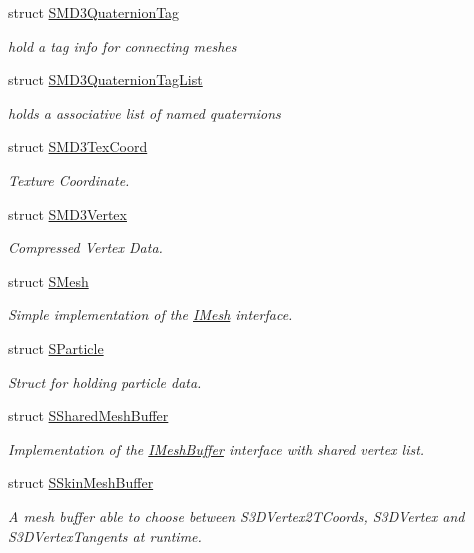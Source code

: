 \begin{DoxyCompactItemize}
struct \hyperlink{structirr_1_1scene_1_1SMD3QuaternionTag}{S\+M\+D3\+Quaternion\+Tag}
\begin{DoxyCompactList}\small\item\em hold a tag info for connecting meshes \end{DoxyCompactList}\item 
struct \hyperlink{structirr_1_1scene_1_1SMD3QuaternionTagList}{S\+M\+D3\+Quaternion\+Tag\+List}
\begin{DoxyCompactList}\small\item\em holds a associative list of named quaternions \end{DoxyCompactList}\item 
struct \hyperlink{structirr_1_1scene_1_1SMD3TexCoord}{S\+M\+D3\+Tex\+Coord}
\begin{DoxyCompactList}\small\item\em Texture Coordinate. \end{DoxyCompactList}\item 
struct \hyperlink{structirr_1_1scene_1_1SMD3Vertex}{S\+M\+D3\+Vertex}
\begin{DoxyCompactList}\small\item\em Compressed Vertex Data. \end{DoxyCompactList}\item 
struct \hyperlink{structirr_1_1scene_1_1SMesh}{S\+Mesh}
\begin{DoxyCompactList}\small\item\em Simple implementation of the \hyperlink{classirr_1_1scene_1_1IMesh}{I\+Mesh} interface. \end{DoxyCompactList}\item 
struct \hyperlink{structirr_1_1scene_1_1SParticle}{S\+Particle}
\begin{DoxyCompactList}\small\item\em Struct for holding particle data. \end{DoxyCompactList}\item 
struct \hyperlink{structirr_1_1scene_1_1SSharedMeshBuffer}{S\+Shared\+Mesh\+Buffer}
\begin{DoxyCompactList}\small\item\em Implementation of the \hyperlink{classirr_1_1scene_1_1IMeshBuffer}{I\+Mesh\+Buffer} interface with shared vertex list. \end{DoxyCompactList}\item 
struct \hyperlink{structirr_1_1scene_1_1SSkinMeshBuffer}{S\+Skin\+Mesh\+Buffer}
\begin{DoxyCompactList}\small\item\em A mesh buffer able to choose between S3\+D\+Vertex2\+T\+Coords, S3\+D\+Vertex and S3\+D\+Vertex\+Tangents at runtime. \end{DoxyCompactList}\item 

\end{DoxyCompactItemize}

